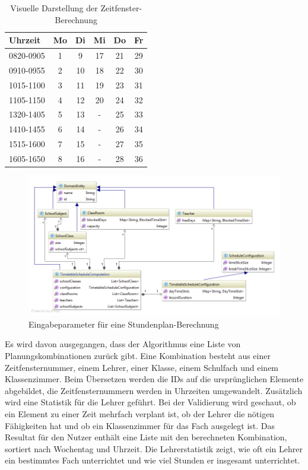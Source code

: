 \begin{table}[ht]
\centering
  \begin{tabular}{ l | c | c | c | c | c }
	\hline
	\rowcolor{gray}
	\textbf{Uhrzeit} 	& \textbf{Mo}	& \textbf{Di} 	& \textbf{Mi}	&  \textbf{Do}	&  \textbf{Fr}\\ \hline
	0820-0905		& 1			& 9			& 17			& 21			& 29		\\ \hline
	0910-0955		& 2			& 10			& 18			& 22			& 30		\\ \hline
	1015-1100		& 3			& 11			& 19			& 23			& 31		\\ \hline
	1105-1150		& 4			& 12			& 20			& 24			& 32		\\ \hline \hline
	1320-1405		& 5			& 13			& -			& 25			& 33		\\ \hline
	1410-1455		& 6			& 14			& -			& 26			& 34		\\ \hline
	1515-1600		& 7			& 15			& -			& 27			& 35		\\ \hline
	1605-1650		& 8			& 16			& -			& 28			& 36		\\ \hline
  \end{tabular}
   \caption{Visuelle Darstellung der Zeitfenster-Berechnung}\label{table:timeslice_calc}
\end{table}

\begin{figure}[h]
\centering
\includegraphics[scale=0.5]{images/probleme/timetableSchedule.png}
\caption[Eingabeparameter für eine Stundenplan-Berechnung]{Eingabeparameter für eine Stundenplan-Berechnung \selfmade{}}
\label{fig:timetableSchedule_input}
\end{figure}

\FloatBarrier

Es wird davon ausgegangen, dass der Algorithmus eine Liste von Planungskombinationen zurück gibt. Eine Kombination besteht aus einer Zeitfensternummer, einem Lehrer, einer Klasse, 
einem Schulfach und einem Klassenzimmer. Beim Übersetzen werden die IDs auf die ursprünglichen Elemente abgebildet, die Zeitfensternummern werden in Uhrzeiten umgewandelt. 
Zusätzlich wird eine Statistik für die Lehrer geführt. Bei der Validierung wird geschaut, ob ein Element zu einer Zeit mehrfach verplant ist, ob der Lehrer die nötigen Fähigkeiten hat und ob ein 
Klassenzimmer für das Fach ausgelegt ist. Das Resultat für den Nutzer enthält eine Liste mit den berechneten Kombination, sortiert nach Wochentag und Uhrzeit. Die Lehrerstatistik zeigt, wie 
oft ein Lehrer ein bestimmtes Fach unterrichtet und wie viel Stunden er insgesamt unterrichtet.

